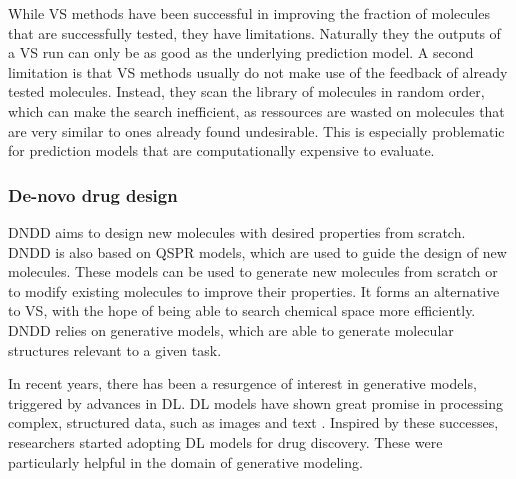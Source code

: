 While \ac{VS} methods have been successful in improving 
the fraction of molecules that are successfully tested, they have limitations. 
Naturally they the outputs of a \ac{VS} run can only be as good as the
underlying prediction model. A second limitation is that \ac{VS} methods
usually do not make use of the feedback of already tested molecules.
Instead, they scan the library of molecules in random order, which 
can make the search inefficient, as ressources are wasted on molecules
that are very similar to ones already found undesirable.
This is especially problematic for prediction models that are 
computationally expensive to evaluate. 



\subsubsection{De-novo drug design}
\Ac{DNDD} aims to design new molecules with desired properties from scratch.
\Ac{DNDD} is also based on \ac{QSPR} models, which are used to guide the
design of new molecules. These models can be used to generate new molecules
from scratch or to modify existing molecules to improve their properties.
It forms an alternative to \ac{VS}, with the hope of being able to search
chemical space more efficiently. \ac{DNDD} relies on generative models, 
which are able to generate molecular structures relevant to a given task.

In recent years, there has been a resurgence of interest in generative models,
triggered by advances in \ac{DL}. \ac{DL} models have shown great promise in
processing complex, structured data, such as images and text \citep{todo}.
Inspired by these successes, researchers started adopting \ac{DL} models for 
drug discovery. These were particularly helpful in the domain of generative
modeling.



